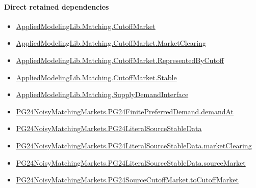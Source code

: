 \documentclass[10pt]{article}
\begin{document}
\paragraph{Direct retained dependencies}
\begin{itemize}\raggedright
\item \hyperlink{governing-declaration-cf2e178968aa3088}{Applied\allowbreak{}Modeling\allowbreak{}Lib.\allowbreak{}Matching.\allowbreak{}Cutoff\allowbreak{}Market}
\item \hyperlink{governing-declaration-e5b9ae646f41eb33}{Applied\allowbreak{}Modeling\allowbreak{}Lib.\allowbreak{}Matching.\allowbreak{}Cutoff\allowbreak{}Market.\allowbreak{}Market\allowbreak{}Clearing}
\item \hyperlink{governing-declaration-3dd3ecccc56daba3}{Applied\allowbreak{}Modeling\allowbreak{}Lib.\allowbreak{}Matching.\allowbreak{}Cutoff\allowbreak{}Market.\allowbreak{}Represented\allowbreak{}By\allowbreak{}Cutoff}
\item \hyperlink{governing-declaration-e3570f2884c32270}{Applied\allowbreak{}Modeling\allowbreak{}Lib.\allowbreak{}Matching.\allowbreak{}Cutoff\allowbreak{}Market.\allowbreak{}Stable}
\item \hyperlink{governing-declaration-74d97e177aca28fc}{Applied\allowbreak{}Modeling\allowbreak{}Lib.\allowbreak{}Matching.\allowbreak{}Supply\allowbreak{}Demand\allowbreak{}Interface}
\item \hyperlink{governing-declaration-3500d2da6c6aa671}{PG24\allowbreak{}Noisy\allowbreak{}Matching\allowbreak{}Markets.\allowbreak{}PG24\allowbreak{}Finite\allowbreak{}Preferred\allowbreak{}Demand.\allowbreak{}demand\allowbreak{}At}
\item \hyperlink{governing-declaration-c1ccb10f906ac674}{PG24\allowbreak{}Noisy\allowbreak{}Matching\allowbreak{}Markets.\allowbreak{}PG24\allowbreak{}Literal\allowbreak{}Source\allowbreak{}Stable\allowbreak{}Data}
\item \hyperlink{governing-declaration-62b4dd3adec308c1}{PG24\allowbreak{}Noisy\allowbreak{}Matching\allowbreak{}Markets.\allowbreak{}PG24\allowbreak{}Literal\allowbreak{}Source\allowbreak{}Stable\allowbreak{}Data.\allowbreak{}market\allowbreak{}Clearing}
\item \hyperlink{governing-declaration-f79ab1f0b7d8c2bf}{PG24\allowbreak{}Noisy\allowbreak{}Matching\allowbreak{}Markets.\allowbreak{}PG24\allowbreak{}Literal\allowbreak{}Source\allowbreak{}Stable\allowbreak{}Data.\allowbreak{}source\allowbreak{}Market}
\item \hyperlink{governing-declaration-0eafdd443349f4ed}{PG24\allowbreak{}Noisy\allowbreak{}Matching\allowbreak{}Markets.\allowbreak{}PG24\allowbreak{}Source\allowbreak{}Cutoff\allowbreak{}Market.\allowbreak{}to\allowbreak{}Cutoff\allowbreak{}Market}
\end{itemize}
\hypertarget{governing-declaration-5bf4f34082e39c14}{}
\end{document}
